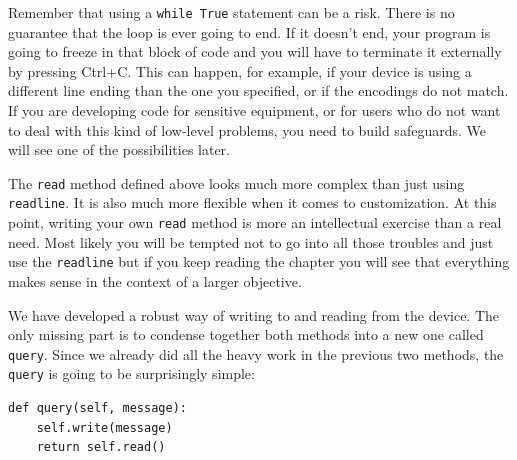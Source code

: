 Remember that using a \texttt{while True} statement can be a risk.
There is no guarantee that the loop is ever going to end. If it doesn't
end, your program is going to freeze in that block of code and you will
have to terminate it externally by pressing Ctrl+C. This can happen, for
example, if your device is using a different line ending than the one
you specified, or if the encodings do not match. If you are developing
code for sensitive equipment, or for users who do not want to deal with
this kind of low-level problems, you need to build safeguards. We will
see one of the possibilities later.

The \texttt{read} method defined above looks much more complex than just
using \texttt{readline}. It is also much more flexible when it comes to
customization. At this point, writing your own \texttt{read} method is
more an intellectual exercise than a real need. Most likely you will be
tempted not to go into all those troubles and just use the
\texttt{readline} but if you keep reading the chapter you will see that
everything makes sense in the context of a larger objective.



We have developed a robust way of writing to and reading from the device. The only missing part
is to condense together both methods into a new one called
\texttt{query}. Since we already did all the heavy work in the previous two
methods, the \texttt{query} is going to be surprisingly simple:

\begin{verbatim}
def query(self, message):
    self.write(message)
    return self.read()
\end{verbatim}

